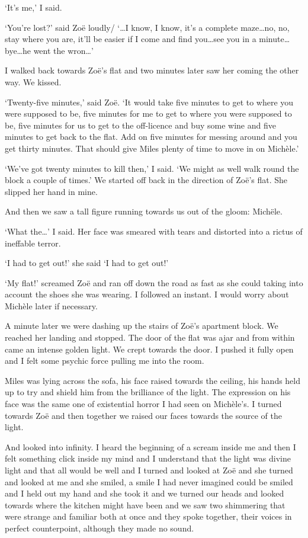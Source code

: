 `It's me,' I said.

`You're lost?' said Zoë loudly/ `\dots I know, I know, it's a
complete maze\dots no, no, stay where you are, it'll be easier if I
come and find you\dots see you in a minute\dots bye\dots he went the
wron\dots'

I walked back towards Zoë's flat and two minutes later saw her
coming the other way. We kissed.

`Twenty-five minutes,' said Zoë. `It would take five minutes to get to
where you were supposed to be, five minutes for me to get to where
you were supposed to be, five minutes for us to get to the
off-licence and buy some wine and five minutes to get back to the
flat. Add on five minutes for messing around and you get thirty
minutes. That should give Miles plenty of time to move in on
Michèle.'

`We've got twenty minutes to kill then,' I said. `We might as well
walk round the block a couple of times.' We started off back in the
direction of Zoë's flat. She slipped her hand in mine.

And then we saw a tall figure running towards us out of the gloom:
Michële.

`What the\dots' I said. Her face was smeared with tears and
distorted into a rictus of ineffable terror.

`I had to get out!' she said `I had to get out!'

`My flat!' screamed Zoë and ran off down the road as fast as she
could taking into account the shoes she was wearing. I followed an
instant. I would worry about Michèle later if necessary.

A minute later we were dashing up the stairs of Zoë's apartment
block. We reached her landing and stopped. The door of the flat was
ajar and from within came an intense golden light. We crept towards
the door. I pushed it fully open and I felt some psychic force
pulling me into the room.

Miles was lying across the sofa, his face raised towards the
ceiling, his hands held up to try and shield him from the brilliance
of the light. The expression on his face was the same one of
existential horror I had seen on Michèle's. I turned towards
Zoë and then together we raised our faces towards the source of
the light.

And looked into infinity. I heard the beginning of a scream inside
me and then I felt something {\twelveit click\/} inside my mind and
I understand that the light was divine light and that all would be
well and I turned and looked at Zoë and she turned and looked at
me and she smiled, a smile I had never imagined could be smiled and
I held out my hand and she took it and we turned our heads and
looked towards where the kitchen might have been and we saw two
shimmering that were strange and familiar both at once and they
spoke together, their voices in perfect counterpoint, although they
made no sound.

